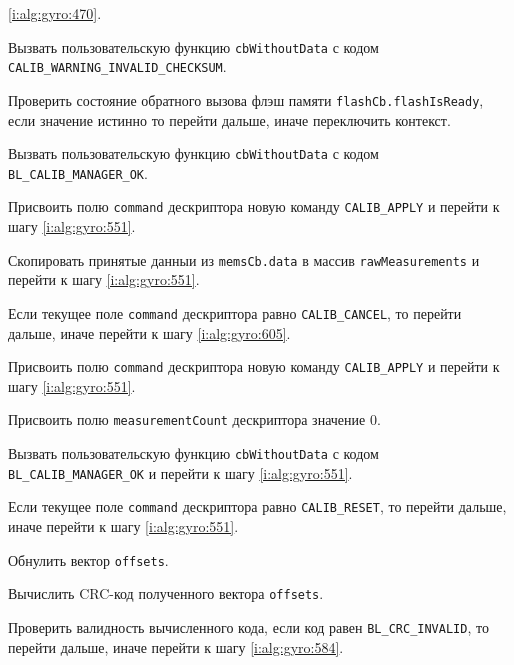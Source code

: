 \begin{enumerate_step}
    \ref{i:alg:gyro:470}.
    \item Вызвать пользовательскую функцию \lstinline|cbWithoutData| с кодом \lstinline|CALIB_WARNING_INVALID_CHECKSUM|.
    \item \label{i:alg:gyro:470} Проверить состояние обратного вызова флэш памяти \lstinline|flashCb.flashIsReady|, если значение истинно то перейти дальше, иначе переключить контекст.
    \item Вызвать пользовательскую функцию \lstinline|cbWithoutData| с кодом \lstinline|BL_CALIB_MANAGER_OK|.
    \item Присвоить полю \lstinline|command| дескриптора  новую команду \lstinline|CALIB_APPLY| и перейти к шагу \ref{i:alg:gyro:551}.

    \item \label{i:alg:gyro:591} Скопировать принятые данныи из \lstinline|memsCb.data| в массив \lstinline|rawMeasurements| и перейти к шагу \ref{i:alg:gyro:551}.

    \item \label{i:alg:gyro:599} Если текущее поле \lstinline|command| дескриптора равно \lstinline|CALIB_CANCEL|, то перейти дальше, иначе перейти к шагу
    \ref{i:alg:gyro:605}.
    \item Присвоить полю \lstinline|command| дескриптора  новую команду \lstinline|CALIB_APPLY| и перейти к шагу \ref{i:alg:gyro:551}.
    \item Присвоить полю \lstinline|measurementCount| дескриптора значение 0.
    \item Вызвать пользовательскую функцию \lstinline|cbWithoutData| с кодом \lstinline|BL_CALIB_MANAGER_OK| и перейти к шагу \ref{i:alg:gyro:551}.
 
    \item \label{i:alg:gyro:605} Если текущее поле \lstinline|command| дескриптора равно \lstinline|CALIB_RESET|, то перейти дальше, иначе перейти к шагу
    \ref{i:alg:gyro:551}.
    \item Обнулить вектор \lstinline|offsets|.
    \item Вычислить CRC-код полученного вектора \lstinline|offsets|.
    \item Проверить валидность вычисленного кода, если код равен \lstinline|BL_CRC_INVALID|, то перейти дальше, иначе перейти к шагу \ref{i:alg:gyro:584}.

\end{enumerate_step}


